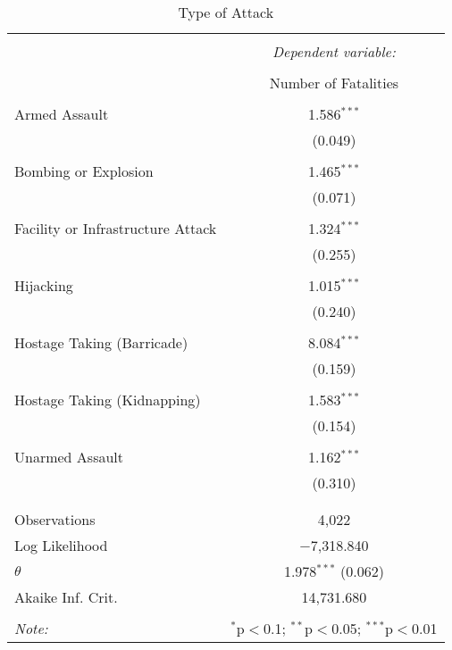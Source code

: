 
\begin{table}[!htbp] \centering 
  \caption{Type of Attack} 
  \label{} 
\begin{tabular}{@{\extracolsep{5pt}}lc} 
\\[-1.8ex]\hline 
\hline \\[-1.8ex] 
 & \multicolumn{1}{c}{\textit{Dependent variable:}} \\ 
\cline{2-2} 
\\[-1.8ex] & Number of Fatalities \\ 
\hline \\[-1.8ex] 
 Armed Assault & 1.586$^{***}$ \\ 
  & (0.049) \\ 
  & \\ 
 Bombing or Explosion & 1.465$^{***}$ \\ 
  & (0.071) \\ 
  & \\ 
 Facility or Infrastructure Attack & 1.324$^{***}$ \\ 
  & (0.255) \\ 
  & \\ 
 Hijacking & 1.015$^{***}$ \\ 
  & (0.240) \\ 
  & \\ 
 Hostage Taking (Barricade) & 8.084$^{***}$ \\ 
  & (0.159) \\ 
  & \\ 
 Hostage Taking (Kidnapping) & 1.583$^{***}$ \\ 
  & (0.154) \\ 
  & \\ 
 Unarmed Assault & 1.162$^{***}$ \\ 
  & (0.310) \\ 
  & \\ 
\hline \\[-1.8ex] 
Observations & 4,022 \\ 
Log Likelihood & $-$7,318.840 \\ 
$\theta$ & 1.978$^{***}$  (0.062) \\ 
Akaike Inf. Crit. & 14,731.680 \\ 
\hline 
\hline \\[-1.8ex] 
\textit{Note:}  & \multicolumn{1}{r}{$^{*}$p$<$0.1; $^{**}$p$<$0.05; $^{***}$p$<$0.01} \\ 
\end{tabular} 
\end{table} 
